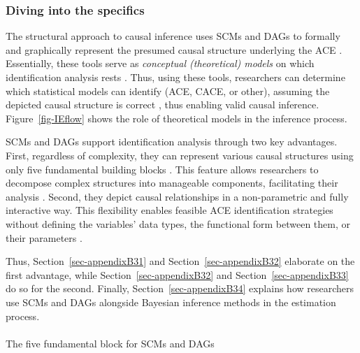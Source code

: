 \documentclass[
  authoryear,
  review,
  1p]{elsarticle}
\makeatletter
\let\oldparagraph\paragraph
\renewcommand{\paragraph}{
    \@ifstar
      \xxxParagraphStar
      \xxxParagraphNoStar
  }
\newcommand{\xxxParagraphStar}[1]{\oldparagraph*{#1}\mbox{}}
\newcommand{\xxxParagraphNoStar}[1]{\oldparagraph{#1}\mbox{}}
\makeatother
\begin{document}
\subsubsection{Diving into the specifics}\label{sec-appendixB3}

The structural approach to causal inference uses SCMs and DAGs to
formally and graphically represent the presumed causal structure
underlying the ACE
\citep{Pearl_2009, Pearl_et_al_2016, Gross_et_al_2018, Neal_2020}.
Essentially, these tools serve as \emph{conceptual (theoretical) models}
on which identification analysis rests
\citep[p.~4]{Schuessler_et_al_2023}. Thus, using these tools,
researchers can determine which statistical models can identify (ACE,
CACE, or other), assuming the depicted causal structure is correct
\citep{McElreath_2020}, thus enabling valid causal inference.
Figure~\ref{fig-IEflow} shows the role of theoretical models in the
inference process.

SCMs and DAGs support identification analysis through two key
advantages. First, regardless of complexity, they can represent various
causal structures using only five fundamental building blocks
\citep{Neal_2020, McElreath_2020}. This feature allows researchers to
decompose complex structures into manageable components, facilitating
their analysis \citep{McElreath_2020}. Second, they depict causal
relationships in a non-parametric and fully interactive way. This
flexibility enables feasible ACE identification strategies without
defining the variables' data types, the functional form between them, or
their parameters \citep[p.~35]{Pearl_et_al_2016}.

Thus, Section~\ref{sec-appendixB31} and Section~\ref{sec-appendixB32}
elaborate on the first advantage, while Section~\ref{sec-appendixB32}
and Section~\ref{sec-appendixB33} do so for the second. Finally,
Section~\ref{sec-appendixB34} explains how researchers use SCMs and DAGs
alongside Bayesian inference methods in the estimation process.

\paragraph{The five fundamental block for SCMs and
DAGs}\label{sec-appendixB31}
\end{document}

